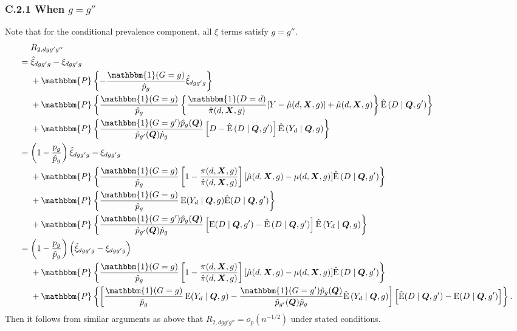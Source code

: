 \documentclass[12pt,a4paper]{article}
\newcommand{\E}{\operatorname{E}}
\def\X{{\boldsymbol X}}
\def\Q{{\boldsymbol Q}}
\def\one{\mathbbm{1}}
\def\P{\mathbbm{P}}
\begin{document}
\subsubsection*{C.2.1 When $g=g''$}
Note that for the conditional prevalence component, all $\xi$ terms satisfy $g=g''$.
\begin{align*}
&\phantom{{}={}} R_{2,dgg'g''} \\
&= \hat{\xi}_{dgg'g} - \xi_{dgg'g} \\
    &\phantom{{}={}} + \P \left\{- \frac{\one(G=g)}{\hat{p}_{g}}  \hat{\xi}_{dgg'g} \right\} \\
    &\phantom{{}={}} + \P \left\{ \frac{\one(G=g) }{\hat{p}_{g}} \left\{ \frac{\one(D=d)}{\hat{\pi}(d,\X,g)} [Y-\hat{\mu}(d,\X,g)]+\hat{\mu}(d,\X,g) \right\} \hat{\E} \left(D \mid \Q,g' \right) \right\} \\
    &\phantom{{}={}} + \P \left\{ \frac{\one(G=g')\hat{p}_{g}(\Q)}{\hat{p}_{g'}(\Q)\hat{p}_{g}} \left[ D-\hat{\E} \left(D \mid \Q, g' \right) \right] \hat{\E}\left( Y_d \mid \Q, g \right) \right\} \\
    &=  \left(1-\frac{p_g}{\hat{p}_g}\right)\hat{\xi}_{dgg'g} - \xi_{dgg'g} \\
    &\phantom{{}={}} + \P \left\{ \frac{\one(G=g) }{\hat{p}_{g}}  \left[ 1-\frac{\pi(d,\X,g)}{\hat{\pi}(d,\X,g)} \right]  [\hat{\mu}(d,\X,g)-\mu(d,\X,g)]  \hat{\E} \left(D \mid \Q,g' \right) \right\} \\
    &\phantom{{}={}}  + \P \left\{ \frac{\one(G=g) }{\hat{p}_{g}} \E(Y_d \mid \Q,g) \hat{\E}(D \mid \Q, g') \right\}\\
    &\phantom{{}={}} + \P \left\{ \frac{\one(G=g')\hat{p}_{g}(\Q)}{\hat{p}_{g'}(\Q)\hat{p}_{g}} \left[ \E(D \mid \Q, g')-\hat{\E} \left(D \mid \Q, g' \right) \right] \hat{\E}\left( Y_d \mid \Q, g \right) \right\} \\
    &= \left(1-\frac{p_g}{\hat{p}_g}\right)\left(\hat{\xi}_{dgg'g} - \xi_{dgg'g} \right) \\
    &\phantom{{}={}} + \P \left\{ \frac{\one(G=g) }{\hat{p}_{g}} \left[ 1-\frac{\pi(d,\X,g)}{\hat{\pi}(d,\X,g)} \right]  [\hat{\mu}(d,\X,g)-\mu(d,\X,g)]  \hat{\E} \left(D \mid \Q,g' \right) \right\} \\
    &\phantom{{}={}} + \P \left\{ \left[ \frac{\one(G=g) }{\hat{p}_{g}} \E(Y_d \mid \Q,g) - \frac{\one(G=g')\hat{p}_{g}(\Q)}{\hat{p}_{g'}(\Q)\hat{p}_{g}} \hat{\E}\left( Y_d \mid \Q, g \right) \right] \left[ \hat{\E}(D \mid \Q, g') - \E(D \mid \Q, g') \right] \right\}.
\end{align*}
Then it follows from similar arguments as above that $R_{2,dgg'g''}=o_p(n^{-1/2})$ under stated conditions.
\end{document}
